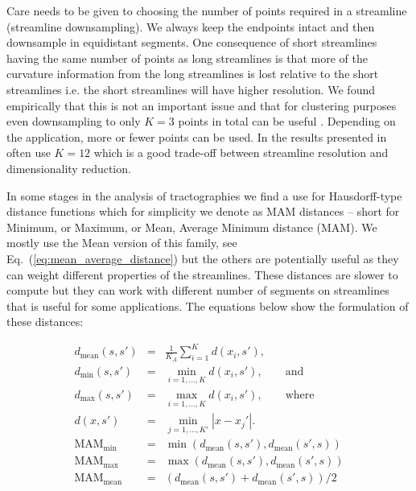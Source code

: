 \documentclass{bioinfo}
\begin{document}
\begin{methods}
Care needs to be given to choosing the number of points required in a
streamline (streamline downsampling). We always keep the endpoints
intact and then downsample in equidistant segments. One consequence of
short streamlines having the same number of points as long streamlines
is that more of the curvature information from the long streamlines is
lost relative to the short streamlines i.e. the short streamlines will
have higher resolution.  We found empirically that this is not an
important issue and that for clustering purposes even downsampling to
only $K=3$ points in total can be useful \cite{EGMB10}. Depending on the
application, more or fewer points can be used. In the results presented
in often use $K=12$ which is a good trade-off between streamline
resolution and dimensionality reduction.

In some stages in the analysis of tractographies we find a use for
Hausdorff-type distance functions which for simplicity we denote as MAM
distances -- short for Minimum, or Maximum, or Mean, Average Minimum
distance (MAM). We mostly use the Mean version of this family, see
Eq.~(\ref{eq:mean_average_distance}) but the others are potentially
useful as they can weight different properties of the streamlines. These
distances are slower to compute but they can work with different number
of segments on streamlines that is useful for some applications. The
equations below show the formulation of these distances:

\begin{eqnarray}
d_{\textrm{mean}}(s,s') & = & \frac{1}{K_{A}}\sum_{i=1}^{K}d(x_{i},s'),\nonumber \\
d_{\textrm{min}}(s,s') & = & \min_{i=1,...,K}d(x_{i},s'),\qquad\textrm{and}\label{eq:minimum_distance}\\
d_{\textrm{max}}(s,s') & = & \max_{i=1,...,K }d(x_{i},s'),\qquad\textrm{where}\label{eq:maximum distance}\\
d(x,s') & = & \min_{j=1,...,K'}|x-x_{j}'|.\nonumber \\
\textrm{MAM}_{\textrm{min}} & = & \min(d_{\textrm{mean}}(s,s'),d_{\textrm{mean}}(s',s))\label{eq:min_average_distance}\\
\textrm{MAM}_{\textrm{max}} & = & \max(d_{\textrm{mean}}(s,s'),d_{\textrm{mean}}(s',s))\nonumber \\
\textrm{MAM}_{\textrm{mean}} & = & (d_{\textrm{mean}}(s,s')+d_{\textrm{mean}}(s',s))/2\label{eq:mean_average_distance}\end{eqnarray}



\end{methods}
\end{document}
